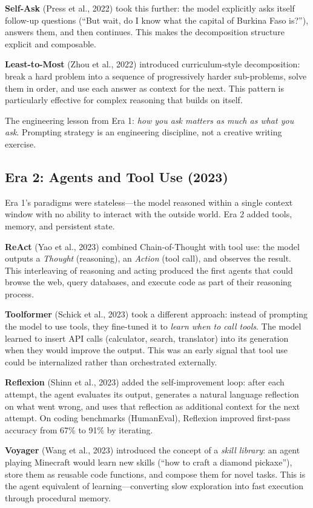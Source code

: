 \textbf{Self-Ask} (Press et al., 2022) took this further: the model explicitly asks itself follow-up questions (``But wait, do I know what the capital of Burkina Faso is?''), answers them, and then continues. This makes the decomposition structure explicit and composable.

\textbf{Least-to-Most} (Zhou et al., 2022) introduced curriculum-style decomposition: break a hard problem into a sequence of progressively harder sub-problems, solve them in order, and use each answer as context for the next. This pattern is particularly effective for complex reasoning that builds on itself.

The engineering lesson from Era 1: \emph{how you ask matters as much as what you ask}. Prompting strategy is an engineering discipline, not a creative writing exercise.

\subsection{Era 2: Agents and Tool Use (2023)}

Era 1's paradigms were stateless---the model reasoned within a single context window with no ability to interact with the outside world. Era 2 added tools, memory, and persistent state.

\textbf{ReAct} (Yao et al., 2023) combined Chain-of-Thought with tool use: the model outputs a \emph{Thought} (reasoning), an \emph{Action} (tool call), and observes the result. This interleaving of reasoning and acting produced the first agents that could browse the web, query databases, and execute code as part of their reasoning process.

\textbf{Toolformer} (Schick et al., 2023) took a different approach: instead of prompting the model to use tools, they fine-tuned it to \emph{learn when to call tools}. The model learned to insert API calls (calculator, search, translator) into its generation when they would improve the output. This was an early signal that tool use could be internalized rather than orchestrated externally.

\textbf{Reflexion} (Shinn et al., 2023) added the self-improvement loop: after each attempt, the agent evaluates its output, generates a natural language reflection on what went wrong, and uses that reflection as additional context for the next attempt. On coding benchmarks (HumanEval), Reflexion improved first-pass accuracy from 67\% to 91\% by iterating.

\textbf{Voyager} (Wang et al., 2023) introduced the concept of a \emph{skill library}: an agent playing Minecraft would learn new skills (``how to craft a diamond pickaxe''), store them as reusable code functions, and compose them for novel tasks. This is the agent equivalent of learning---converting slow exploration into fast execution through procedural memory.

